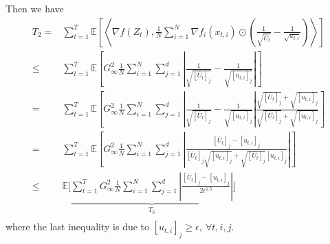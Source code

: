 \documentclass{article} %
\begin{document}
Then we have 
\begin{align}\label{eq: T_2_bound}
T_2 =& \sum_{t=1}^T \mathbb E \left [ \left \langle \nabla f( Z_{t}), \frac{1}{N} \sum_{i=1}^N \nabla f_i( x_{t,i})\odot \left( \frac{1}{\sqrt{\overline U_{t}}} -\frac{1}{\sqrt{u_{t,i}}}  \right)  \right \rangle \right] \nonumber \\
\leq & \sum_{t=1}^T \mathbb E \left [  G_{\infty}^2  \frac{1}{N} \sum_{i=1}^N \sum_{j=1}^d \left| \frac{1}{\sqrt{[\overline U_{t}]_j}} -\frac{1}{\sqrt{[u_{t,i}]_{j}}}  \right| \right] \nonumber \\
= & \sum_{t=1}^T \mathbb E \left [  G_{\infty}^2  \frac{1}{N} \sum_{i=1}^N \sum_{j=1}^d \left| \frac{1}{\sqrt{[\overline U_{t}]_j}} -\frac{1}{\sqrt{[u_{t,i}]_{j}}}  \right| \frac{\sqrt{[\overline U_{t}]_j} + \sqrt{[u_{t,i}]_{j}} }{\sqrt{[\overline U_{t}]_j} + \sqrt{[u_{t,i}]_{j}}} \right] \nonumber\\
= & \sum_{t=1}^T \mathbb E \left [  G_{\infty}^2  \frac{1}{N} \sum_{i=1}^N \sum_{j=1}^d \left| \frac{[\overline U_{t}]_j - [u_{t,i}]_{j} }{{[\overline U_{t}]_j}\sqrt{[u_{t,i}]_{j}} + \sqrt{[\overline U_{t}]_j}{[u_{t,i}]_{j}}}  \right| \right] \nonumber \\
\leq &   \mathbb E \bigg [ \underbrace{ \sum_{t=1}^T  G_{\infty}^2  \frac{1}{N} \sum_{i=1}^N \sum_{j=1}^d \left| \frac{[\overline U_{t}]_j - [u_{t,i}]_{j} }{2 \epsilon^{1.5}}  \right| }_{T_6} \bigg ] \nonumber \\
\end{align}
where the last inequality is due to $[u_{t,i}]_j \geq \epsilon,\ \forall t,i,j$.
\end{document}
